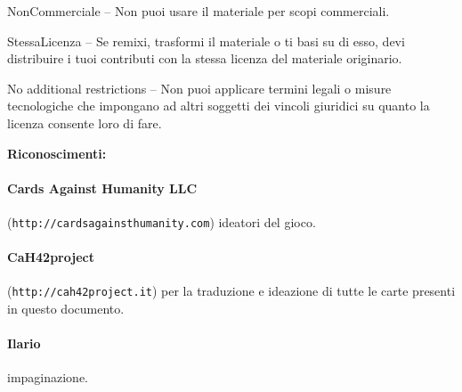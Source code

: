 \documentclass[a4paper,12pt]{article}
\begin{document}
    NonCommerciale -- Non puoi usare il materiale per scopi commerciali.
\indent

    StessaLicenza -- Se remixi, trasformi il materiale o ti basi su di esso, devi distribuire i tuoi contributi con la stessa licenza del materiale originario.
\indent

    No additional restrictions -- Non puoi applicare termini legali o misure tecnologiche che impongano ad altri soggetti dei vincoli giuridici su quanto la licenza consente loro di fare.

\bigskip\bigskip

\begin{center}\bf{Riconoscimenti:}\end{center}

\paragraph{Cards Against Humanity LLC} (\texttt{http://cardsagainsthumanity.com}) ideatori del gioco.

\paragraph{CaH42project} (\texttt{http://cah42project.it}) per la traduzione e ideazione di tutte le carte presenti in questo documento.

\paragraph{Ilario} impaginazione.
\end{document}
